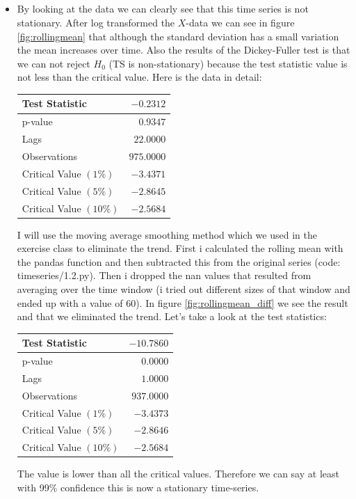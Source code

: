 \documentclass[]{article}
\begin{document}
	\subsection{}
	
	\begin{itemize}
		\item By looking at the data we can clearly see that this time series is not stationary. After log transformed the $X$-data we can see in figure \ref*{fig:rollingmean} that although the standard deviation has a small variation the mean increases over time. Also the results of the Dickey-Fuller test is that we can not reject $H_0$ (TS is non-stationary) because the test statistic value is not less than the critical value. Here is the data in detail: 
		\begin{center}
			\begin{tabular}{|l|r|}
				\hline Test Statistic & $-0.2312$ \\
				\hline p-value & $0.9347$ \\
				\hline Lags & $22.0000$ \\
				\hline Observations & $975.0000$ \\
				\hline Critical Value $(1 \%)$ & $-3.4371$ \\
				\hline Critical Value $(5 \%)$ & $-2.8645$ \\
				\hline Critical Value $(10 \%)$ & $-2.5684$ \\
				\hline
			\end{tabular}
			\label{tab:dickey}
		\end{center}
		I will use the moving average smoothing method which we used in the exercise class to eliminate the trend. First i calculated the rolling mean with the pandas function and then subtracted this from the original series (code: timeseries/1.2.py). Then i dropped the nan values that resulted from averaging over the time window (i tried out different sizes of that window and ended up with a value of 60). In figure \ref{fig:rollingmean_diff} we see the result and that we eliminated the trend. Let's take a look at the test statistics:
		\begin{center}
			\begin{tabular}{|l|r|}
				\hline Test Statistic & $-10.7860$ \\
				\hline p-value & $0.0000$ \\
				\hline Lags & $1.0000$ \\
				\hline Observations & $937.0000$ \\
				\hline Critical Value $(1 \%)$ & $-3.4373$ \\
				\hline Critical Value $(5 \%)$ & $-2.8646$ \\
				\hline Critical Value $(10 \%)$ & $-2.5684$ \\
				\hline
			\end{tabular}
		\end{center}
		The value is lower than all the critical values. Therefore we can say at least with 99\% confidence this is now a stationary time-series.
		

\end{itemize}
\end{document}
